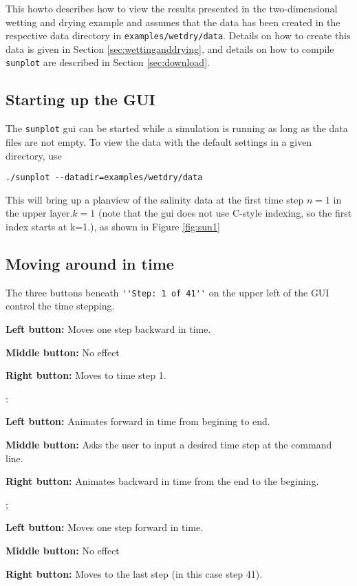 \documentclass[12pt,oneside]{article}
\begin{document}
This howto describes how to view the results presented in the two-dimensional wetting
and drying example and assumes that the data has been created in the respective data directory
in \verb+examples/wetdry/data+.  Details on how to create this data is given in Section \ref{sec:wettinganddrying},
and details on how to compile \verb+sunplot+ are described in Section \ref{sec:download}.

\subsection{Starting up the GUI}

The \verb+sunplot+ gui can be started while a simulation is running as long as the data files
are not empty.  To view the data with the default settings in a given directory, use
\begin{verbatim}
./sunplot --datadir=examples/wetdry/data
\end{verbatim}
This will bring up a planview of the salinity data at the first time step $n=1$ in the upper layer.$k=1$ (note
that the gui does not use C-style indexing, so the first index starts at k=1.), as shown in Figure
\ref{fig:sun1}

\subsection{Moving around in time}

The three buttons beneath \verb+''Step: 1 of 41''+ on the upper left of the GUI control the time stepping.
\begin{list}{}
\item \button{$<--$}
\begin{list}{}
\item {\bf Left button:} Moves one step backward in time.
\item {\bf Middle button:} No effect
\item {\bf Right button:} Moves to time step 1.
\end{list}
\item {}: 
\begin{list}{}
\item {\bf Left button:} Animates forward in time from begining to end.
\item {\bf Middle button:} Asks the user to input a desired time step at the command line.
\item {\bf Right button:} Animates backward in time from the end to the begining.
\end{list}
\item \button{$-->$};
\begin{list}{}
\item {\bf Left button:} Moves one step forward in time.
\item {\bf Middle button:} No effect
\item {\bf Right button:} Moves to the last step (in this case step 41).
\end{list}
\end{list}
\end{document}
